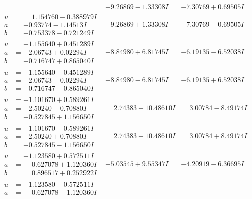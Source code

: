 \documentclass[1p]{elsarticle_modified}
\theoremstyle{definition}
\begin{document}
$$\begin{array}{c|c|c}
 & -9.26869 - 1.33308 I & -7.30769 + 0.69505 I \\ \hline\begin{aligned}
u &= \phantom{-}1.154760 - 0.388979 I \\
a &= -0.93774 - 1.14513 I \\
b &= -0.753378 - 0.721249 I\end{aligned}
 & -9.26869 + 1.33308 I & -7.30769 - 0.69505 I \\ \hline\begin{aligned}
u &= -1.155640 + 0.451289 I \\
a &= -2.06743 + 0.02294 I \\
b &= -0.716747 + 0.865040 I\end{aligned}
 & -8.84980 + 6.81745 I & -6.19135 - 6.52038 I \\ \hline\begin{aligned}
u &= -1.155640 - 0.451289 I \\
a &= -2.06743 - 0.02294 I \\
b &= -0.716747 - 0.865040 I\end{aligned}
 & -8.84980 - 6.81745 I & -6.19135 + 6.52038 I \\ \hline\begin{aligned}
u &= -1.101670 + 0.589261 I \\
a &= -2.50240 - 0.70880 I \\
b &= -0.527845 + 1.156650 I\end{aligned}
 & \phantom{-}2.74383 + 10.48610 I & \phantom{-}3.00784 - 8.49174 I \\ \hline\begin{aligned}
u &= -1.101670 - 0.589261 I \\
a &= -2.50240 + 0.70880 I \\
b &= -0.527845 - 1.156650 I\end{aligned}
 & \phantom{-}2.74383 - 10.48610 I & \phantom{-}3.00784 + 8.49174 I \\ \hline\begin{aligned}
u &= -1.123580 + 0.572511 I \\
a &= \phantom{-}0.627078 + 1.120360 I \\
b &= \phantom{-}0.896517 + 0.252922 I\end{aligned}
 & -5.03545 + 9.55347 I & -4.20919 - 6.36695 I \\ \hline\begin{aligned}
u &= -1.123580 - 0.572511 I \\
a &= \phantom{-}0.627078 - 1.120360 I \\

\end{aligned}
\end{array}$$
\end{document}
